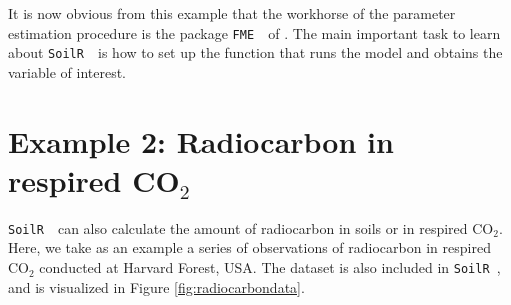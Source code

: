 \documentclass[a4paper]{article}\usepackage[]{graphicx}\usepackage[]{color}
\newcommand{\SoilR}{\texttt{SoilR }}
\newcommand{\FME}{\texttt{FME }}
\begin{document}
\clearpage
It is now obvious from this example that the workhorse of the parameter estimation procedure is the package \FME \, of \citet{Soetaert}. The main important task to learn about \SoilR \, is how to set up the function that runs the model and obtains the variable of interest.  

\section*{Example 2: Radiocarbon in respired CO$_2$}
\SoilR \, can also calculate the amount of radiocarbon in soils or in respired CO$_2$. Here, we take as an example a series of observations of radiocarbon in respired CO$_2$ conducted at Harvard Forest, USA. The dataset is also included in \SoilR, and is visualized in Figure \ref{fig:radiocarbondata}.
\end{document}
